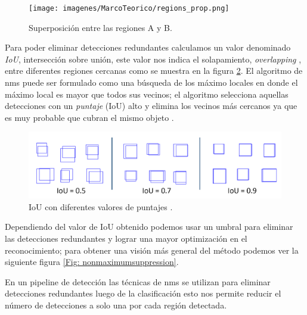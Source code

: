\begin{figure}[H]
 \centering
  \texttt{[image: imagenes/MarcoTeorico/regions\_prop.png]}
  \caption{Superposición entre las regiones A y B.} \label{Fig: overlapping}
\end{figure}

Para poder eliminar detecciones redundantes calculamos un valor denominado  \textit{IoU}, intersección sobre unión,  este valor nos indica el solapamiento, \textit{overlapping} ,  entre diferentes regiones cercanas como se muestra en la figura \ref{Fig: interseccion}. El algoritmo de \ac{nms} puede ser formulado como una búsqueda de los máximo locales en donde el máximo local es  mayor que todos sus vecinos; el algoritmo selecciona aquellas detecciones con un \textit{puntaje} (IoU) alto y elimina los vecinos más cercanos ya que es muy probable que cubran el mismo objeto \citep{nms2}.

\begin{figure}[H]
 \centering
  \includegraphics[scale=0.3,keepaspectratio=true,clip=true]{imagenes/MarcoTeorico/overlapping.png}
  \caption{IoU con diferentes valores de puntajes \citep{bishop}.}\label{Fig: interseccion}
\end{figure}

Dependiendo del valor de IoU  obtenido podemos usar un umbral para  eliminar las detecciones redundantes y lograr una mayor optimización  en el reconocimiento; para obtener una visión más general del método podemos ver la siguiente figura \ref{Fig: nonmaximumsuppression}. 

En un pipeline de detección las técnicas de \ac{nms}  se utilizan para eliminar detecciones redundantes luego de la clasificación esto nos permite reducir el número de detecciones a solo una por cada región detectada.

